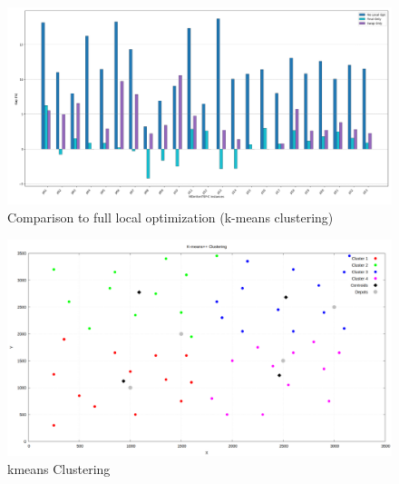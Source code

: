\documentclass[twocolumn]{article}
\begin{document}
	\begin{figure}[t]
		\caption{Comparison to full local optimization (k-means clustering)}
		\centering
		\includegraphics[width=\textwidth]{local_opt_comp_to_full_kmeans}
	\end{figure}
	\begin{figure}[t]
		\caption[width=\textwidth]{kmeans Clustering}
		\includegraphics[width=\textwidth]{kmeans-01}
		\centering
	\end{figure}
	
\end{document}
